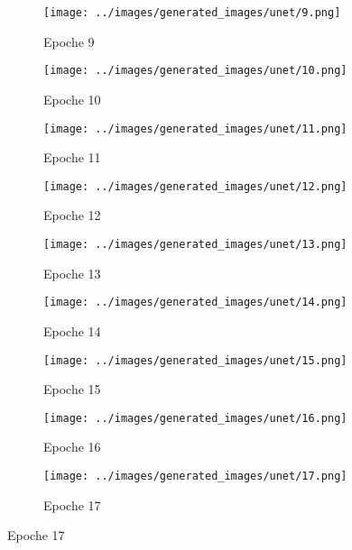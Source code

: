 \begin{figure}[H]
\begin{subfigure}[b]{0.1\textwidth}
   \centering
   \texttt{[image: ../images/generated\_images/unet/9.png]}
   \caption{Epoche 9}
 \end{subfigure}
 \hspace{1em}%
 \begin{subfigure}[b]{0.1\textwidth}
   \centering
   \texttt{[image: ../images/generated\_images/unet/10.png]}
   \caption{Epoche 10}
 \end{subfigure}
 \hspace{1em}%
 \begin{subfigure}[b]{0.1\textwidth}
   \centering
   \texttt{[image: ../images/generated\_images/unet/11.png]}
   \caption{Epoche 11}
 \end{subfigure}
 \hspace{1em}%
 \begin{subfigure}[b]{0.1\textwidth}
 \centering
 \texttt{[image: ../images/generated\_images/unet/12.png]}
 \caption{Epoche 12}
 \end{subfigure}
 \hspace{1em}%
 \begin{subfigure}[b]{0.1\textwidth}
   \centering
   \texttt{[image: ../images/generated\_images/unet/13.png]}
   \caption{Epoche 13}
 \end{subfigure}
 \hspace{1em}%
 \begin{subfigure}[b]{0.1\textwidth}
   \centering
   \texttt{[image: ../images/generated\_images/unet/14.png]}
   \caption{Epoche 14}
 \end{subfigure}
 \hspace{1em}%
 \begin{subfigure}[b]{0.1\textwidth}
   \centering
   \texttt{[image: ../images/generated\_images/unet/15.png]}
   \caption{Epoche 15}
 \end{subfigure}
 \hspace{1em}%
 \begin{subfigure}[b]{0.1\textwidth}
 \centering
 \texttt{[image: ../images/generated\_images/unet/16.png]}
 \caption{Epoche 16}
 \end{subfigure}
 \hspace{1em}%
 \begin{subfigure}[b]{0.1\textwidth}
 \centering
 \texttt{[image: ../images/generated\_images/unet/17.png]}
 \caption{Epoche 17}
\end{subfigure}
\hspace{1em}%

\end{figure}
